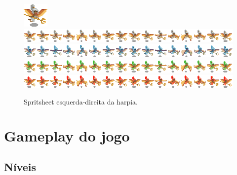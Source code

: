 \documentclass[11pt]{article} %
\begin{document}
\begin{figure}[!htp]
\centering
\advance\leftskip-4cm
\advance\rightskip-3cm
\includegraphics[scale=2]{res/units/harpia/preharpia.png} \quad
\includegraphics[scale=0.7]{res/units/harpia/harpiasheet.png} \quad
\includegraphics[scale=0.7]{res/units/harpia/harpiasheet_congelado.png} \quad
\includegraphics[scale=0.7]{res/units/harpia/harpiasheet_verde.png} \quad
\includegraphics[scale=0.7]{res/units/harpia/harpiasheet_vermelho.png} 
\caption{Spritsheet esquerda-direita da harpia.}
\label{harpiasheet}
\end{figure}

\newpage

\section{Gameplay do jogo}
\subsection{Níveis}
\end{document}
